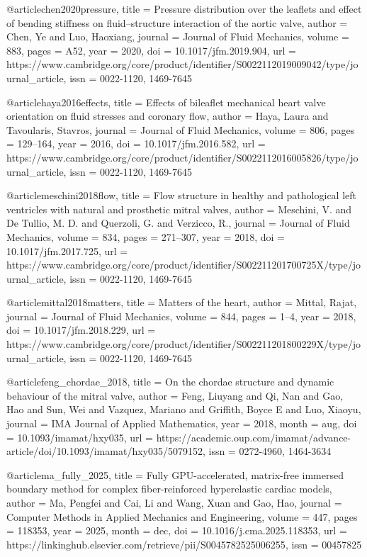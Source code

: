 @article{chen2020pressure,
  title = {Pressure distribution over the leaflets and effect of bending stiffness on fluid–structure interaction of the aortic valve},
  author = {Chen, Ye and Luo, Haoxiang},
  journal = {Journal of Fluid Mechanics},
  volume = {883},
  pages = {A52},
  year = {2020},
  doi = {10.1017/jfm.2019.904},
  url = {https://www.cambridge.org/core/product/identifier/S0022112019009042/type/journal_article},
  issn = {0022-1120, 1469-7645}
}

@article{haya2016effects,
  title = {Effects of bileaflet mechanical heart valve orientation on fluid stresses and coronary flow},
  author = {Haya, Laura and Tavoularis, Stavros},
  journal = {Journal of Fluid Mechanics},
  volume = {806},
  pages = {129--164},
  year = {2016},
  doi = {10.1017/jfm.2016.582},
  url = {https://www.cambridge.org/core/product/identifier/S0022112016005826/type/journal_article},
  issn = {0022-1120, 1469-7645}
}

@article{meschini2018flow,
  title = {Flow structure in healthy and pathological left ventricles with natural and prosthetic mitral valves},
  author = {Meschini, V. and De Tullio, M. D. and Querzoli, G. and Verzicco, R.},
  journal = {Journal of Fluid Mechanics},
  volume = {834},
  pages = {271--307},
  year = {2018},
  doi = {10.1017/jfm.2017.725},
  url = {https://www.cambridge.org/core/product/identifier/S002211201700725X/type/journal_article},
  issn = {0022-1120, 1469-7645}
}

@article{mittal2018matters,
  title = {Matters of the heart},
  author = {Mittal, Rajat},
  journal = {Journal of Fluid Mechanics},
  volume = {844},
  pages = {1--4},
  year = {2018},
  doi = {10.1017/jfm.2018.229},
  url = {https://www.cambridge.org/core/product/identifier/S002211201800229X/type/journal_article},
  issn = {0022-1120, 1469-7645}
}

@article{feng_chordae_2018,
  title = {On the chordae structure and dynamic behaviour of the mitral valve},
  author = {Feng, Liuyang and Qi, Nan and Gao, Hao and Sun, Wei and Vazquez, Mariano and Griffith, Boyce E and Luo, Xiaoyu},
  journal = {IMA Journal of Applied Mathematics},
  year = {2018},
  month = {aug},
  doi = {10.1093/imamat/hxy035},
  url = {https://academic.oup.com/imamat/advance-article/doi/10.1093/imamat/hxy035/5079152},
  issn = {0272-4960, 1464-3634}
}

@article{ma_fully_2025,
  title = {Fully GPU-accelerated, matrix-free immersed boundary method for complex fiber-reinforced hyperelastic cardiac models},
  author = {Ma, Pengfei and Cai, Li and Wang, Xuan and Gao, Hao},
  journal = {Computer Methods in Applied Mechanics and Engineering},
  volume = {447},
  pages = {118353},
  year = {2025},
  month = {dec},
  doi = {10.1016/j.cma.2025.118353},
  url = {https://linkinghub.elsevier.com/retrieve/pii/S0045782525006255},
  issn = {00457825}
}

